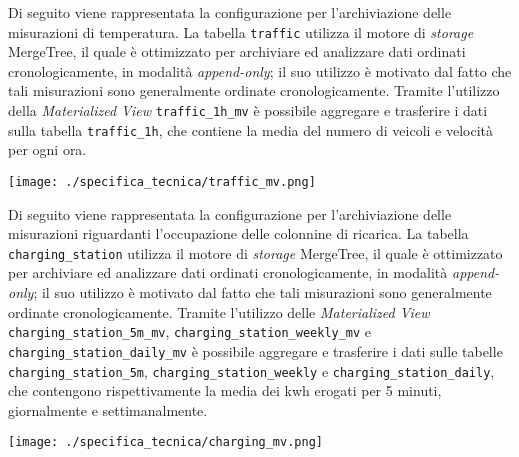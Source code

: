 Di seguito viene rappresentata la configurazione per l'archiviazione delle misurazioni di temperatura. La tabella \texttt{traffic} utilizza il motore di \textit{storage}
MergeTree, il quale è ottimizzato per archiviare ed analizzare dati ordinati cronologicamente, in modalità \textit{append-only}; il suo
utilizzo è motivato dal fatto che tali misurazioni sono generalmente ordinate cronologicamente.
Tramite l'utilizzo della \textit{Materialized View} \texttt{traffic\_1h\_mv}
è possibile aggregare e trasferire i dati sulla tabella \texttt{traffic\_1h}, che contiene la media del numero di veicoli e velocità per ogni ora.
\begin{center}
	\texttt{[image: ./specifica\_tecnica/traffic\_mv.png]}
\end{center}

Di seguito viene rappresentata la configurazione per l'archiviazione delle misurazioni riguardanti l'occupazione delle colonnine di ricarica.
La tabella \texttt{charging\_station} utilizza il motore di \textit{storage} MergeTree, il quale è ottimizzato per archiviare ed analizzare dati ordinati cronologicamente,
in modalità \textit{append-only}; il suo utilizzo è motivato dal fatto che tali misurazioni sono generalmente ordinate cronologicamente.
Tramite l'utilizzo delle \textit{Materialized View} \texttt{charging\_station\_5m\_mv}, \texttt{charging\_station\_weekly\_mv} e \\\texttt{charging\_station\_daily\_mv}
è possibile aggregare e trasferire i dati sulle tabelle \texttt{charging\_station\_5m}, \texttt{charging\_station\_weekly} e \texttt{charging\_station\_daily},
che contengono rispettivamente la media dei kwh erogati per 5 minuti, giornalmente e settimanalmente.
\begin{center}
	\texttt{[image: ./specifica\_tecnica/charging\_mv.png]}
\end{center}

